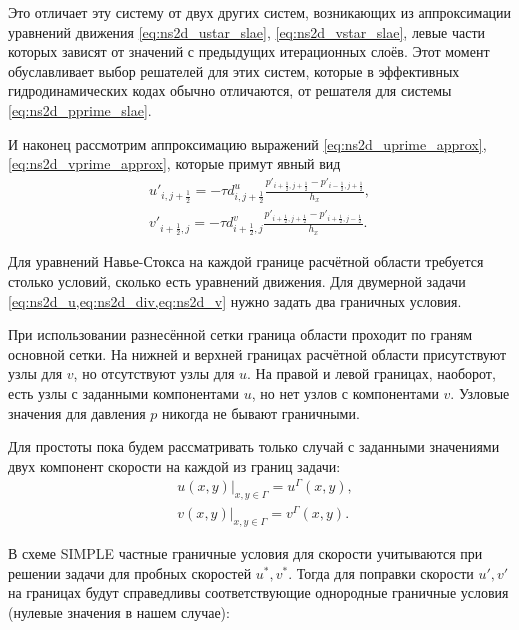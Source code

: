 Это отличает эту систему от двух других систем, возникающих
из аппроксимации уравнений движения \eqref{eq:ns2d_ustar_slae}, \eqref{eq:ns2d_vstar_slae},
левые части которых зависят от значений с предыдущих
итерационных слоёв. Этот момент обуславливает выбор
решателей для этих систем, которые в эффективных гидродинамических кодах обычно
отличаются, от решателя для системы \eqref{eq:ns2d_pprime_slae}.


И наконец рассмотрим аппроксимацию выражений \eqref{eq:ns2d_uprime_approx},
\eqref{eq:ns2d_vprime_approx}, которые примут явный вид
\begin{align}
    \label{eq:ns2d_uprime_discr}
    u'_{i,j+\tfrac12} = -\tau d^u_{i,j+\tfrac12} \frac{p'_{i+\tfrac12,j+\tfrac12} - p'_{i-\tfrac12, j+\tfrac12}}{h_x}, \\[10pt]
    \label{eq:ns2d_vprime_discr}
    v'_{i+\tfrac12,j} = -\tau d^v_{i+\tfrac12,j} \frac{p'_{i+\tfrac12,j+\tfrac12} - p'_{i+\tfrac12, j-\tfrac12}}{h_x}.
\end{align}

\label{sec:simple-bc}

Для уравнений Навье-Стокса на каждой границе расчётной области
требуется столько условий, сколько есть уравнений движения.
Для двумерной задачи \cref{eq:ns2d_u,eq:ns2d_div,eq:ns2d_v}
нужно задать два граничных условия.

При использовании разнесённой сетки граница области проходит
по граням основной сетки. 
На нижней и верхней границах расчётной области
присутствуют узлы для $v$, но отсутствуют
узлы для $u$.
На правой и левой границах, наоборот,
есть узлы с заданными компонентами $u$,
но нет узлов с компонентами $v$.
Узловые значения для давления $p$
никогда не бывают граничными.

Для простоты пока будем рассматривать только случай с заданными значениями
двух компонент скорости на каждой из границ задачи:
\begin{align*}
    &\left. u(x, y) \right|_{x,y\in\Gamma} = u^\Gamma(x, y), \\
    &\left. v(x, y) \right|_{x,y\in\Gamma} = v^\Gamma(x, y).
\end{align*}

В схеме SIMPLE частные граничные условия 
для скорости учитываются при решении задачи
для пробных скоростей $u^*, v^*$.
Тогда для поправки скорости $u', v'$ на границах
будут справедливы соответствующие однородные граничные условия (нулевые значения в нашем случае):

